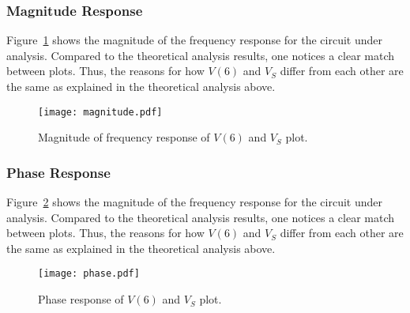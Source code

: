 \subsubsection{Magnitude Response}

Figure~\ref{fig:magsim} shows the magnitude of the frequency response for the circuit under analysis. Compared to the theoretical analysis results, one notices a clear match between plots. Thus, the reasons for how $V(6)$ and $V_S$ differ from each other are the same as explained in the theoretical analysis above.

\begin{figure}[h] \centering
\texttt{[image: magnitude.pdf]}
	\caption{Magnitude of frequency response of $V(6)$ and $V_S$ plot.}
\label{fig:magsim}
\end{figure}

\newpage

\subsubsection{Phase Response}

Figure~\ref{fig:phasesim} shows the magnitude of the frequency response for the circuit under analysis. Compared to the theoretical analysis results, one notices a clear match between plots. Thus, the reasons for how $V(6)$ and $V_S$ differ from each other are the same as explained in the theoretical analysis above.

\begin{figure}[h] \centering
\texttt{[image: phase.pdf]}
	\caption{Phase response of $V(6)$ and $V_S$ plot.}
\label{fig:phasesim}
\end{figure}

